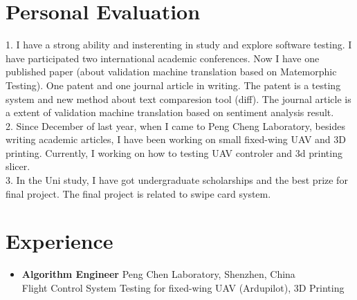 \documentclass[]{friggeri-cv}
\renewenvironment{entrylist}{%
  \begin{itemize}[leftmargin=1in]%
  }{%
  \end{itemize}
}
\renewcommand{\entry}[4]{%
\item[#1]
  \textbf{#2}%
  \hfill%
  {\footnotesize\addfontfeature{Color=myblue} #3}\\%
  #4\vspace{\parsep}%
}
\begin{document}
\section{Personal Evaluation}
1. I have a strong ability and insterenting in study and explore software
testing. I have participated two international academic conferences. Now I have
one published paper (about validation machine translation based on Matemorphic
Testing). One patent and one journal article in writing. The patent is a testing
system and new method about text comparesion tool (diff). The journal article is
a extent of validation machine translation based on sentiment analysis result.\\
2. Since December of last year, when I came to Peng Cheng Laboratory, besides
writing academic articles, I have been working on small fixed-wing UAV and 3D
printing. Currently, I working on how to testing UAV controler and 3d printing
slicer.\\
3. In the Uni study, I have got undergraduate scholarships and the best prize
for final project. The final project is related to swipe card system.

\section{Experience}
\begin{entrylist}
  \entry
  {2018.12 - Now\\}
  {\large{Algorithm Engineer}}
  {Peng Chen Laboratory, Shenzhen, China}
  {Flight Control System Testing for fixed-wing UAV (Ardupilot), 3D Printing}

\end{entrylist}
\end{document}
